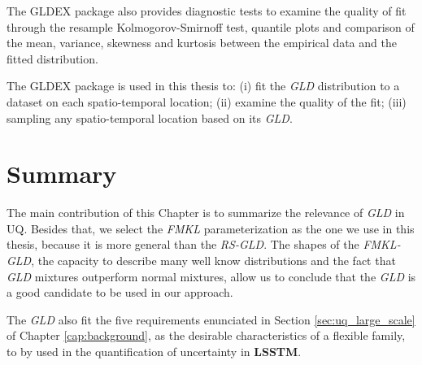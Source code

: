 The GLDEX package also provides diagnostic tests to examine the quality of fit through the resample Kolmogorov-Smirnoff test, quantile plots and comparison of the mean, variance, skewness and kurtosis between the empirical data and the fitted distribution.

The GLDEX package is used in this thesis to: (i) fit the \textit{GLD} distribution to a dataset on each spatio-temporal location; (ii) examine the quality of the fit; (iii) sampling any spatio-temporal location based on its \textit{GLD}.

\section{Summary}\label{sec:gld_summary}
The main contribution of this Chapter is to summarize the relevance of \textit{GLD} in UQ. Besides that, we select the \textit{FMKL} parameterization as the one we use in this thesis, because it is more general than the \textit{RS-GLD}. The shapes of the \textit{FMKL-GLD}, the capacity to describe many well know distributions and the fact that \textit{GLD} mixtures outperform normal mixtures, allow us to conclude that the \textit{GLD} is a good candidate to be used in our approach. 

The \textit{GLD} also fit the five requirements enunciated in Section \ref{sec:uq_large_scale} of Chapter \ref{cap:background}, as the desirable characteristics of a flexible family, to by used in the quantification of uncertainty in \textbf{LSSTM}.

